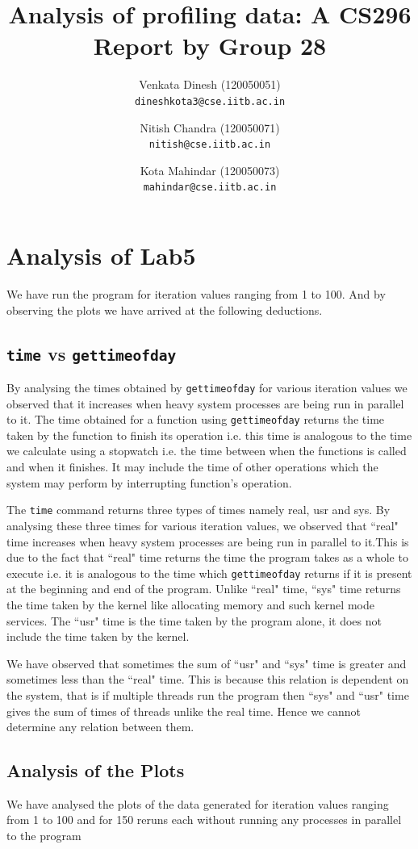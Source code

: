 \documentclass[11pt]{article}
\title{Analysis of profiling data: A CS296 Report by Group 28}
\author{Venkata Dinesh (120050051)\\
\texttt {dineshkota3@cse.iitb.ac.in}\and
Nitish Chandra (120050071)\\
\texttt{nitish@cse.iitb.ac.in}\and
Kota Mahindar (120050073)\\
\texttt{mahindar@cse.iitb.ac.in}
}
\date{}
\begin{document}
\maketitle
\section{Analysis of Lab5}
We have run the program for iteration values ranging from 1 to 100. And by observing the plots we have arrived at the following deductions.
\subsection{{\tt time} vs {\tt gettimeofday}}
By analysing the times obtained by {\tt gettimeofday} for various iteration values we observed that it increases when heavy system processes are being run in parallel to it. The time obtained for a function using {\tt gettimeofday} returns the time taken by the function to finish its operation i.e. this time is analogous to the time we calculate using a stopwatch i.e. the time between when the functions is called and when it finishes. It may include the time of other operations which the system may perform by interrupting function's operation.

The {\tt time} command returns three types of times namely real, usr and sys. By analysing these three times for various iteration values, we observed that ``real" time increases when heavy system processes are being run in parallel to it.This is due to the fact that ``real" time returns the time the program takes as a whole to execute i.e. it is analogous to the time which {\tt gettimeofday} returns if it is present at the beginning and end of the program. Unlike ``real" time, ``sys" time returns the time taken by the kernel like allocating memory and such kernel mode services. The ``usr" time is the time taken by the program alone, it does not include the time taken by the kernel.

We have observed that sometimes the sum of ``usr" and ``sys" time is greater and sometimes less than the ``real" time. This is because this relation is dependent on the system, that is if multiple threads run the program then ``sys" and ``usr" time gives the sum of times of threads unlike the real time. Hence we cannot determine any relation between them.

\subsection{Analysis of the Plots}
We have analysed the plots of the data generated for iteration values ranging from 1 to 100 and for 150 reruns each without running any  processes in parallel
to the program
\end{document}
